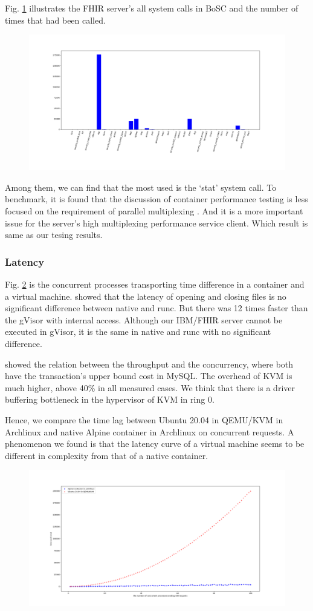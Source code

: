 Fig. \ref{hist} illustrates the FHIR server's all system calls in
BoSC \cite{1495942} and the number of times that had been called.
\begin{figure}
    \centering
    \includegraphics[width=.5\textwidth]{src/hist.png}
    \label{hist}
\end{figure}
Among them, we can find that the most used is the `stat' system call.
To benchmark, it is found that the discussion of container performance testing is less
focused on the requirement of parallel multiplexing
\cite{7371699,KOZHIRBAYEV2017175,7095802,234857}. And it is a more
important issue for the server's high multiplexing performance service client.
Which result is same as our tesing results.

\subsubsection{Latency}
Fig. \ref{conc} is the concurrent processes transporting time
difference in a container and a virtual machine.
\textcite{234857} showed that the latency of opening and closing files
is no significant difference between native and runc. But there was 12 times
faster than the gVisor with internal access. Although our IBM/FHIR server
cannot be executed in gVisor, it is the same in native and runc with no
significant difference.

\textcite{7095802} showed the relation between the throughput and the concurrency,
where both have the transaction's upper bound cost in MySQL. The overhead of KVM is
much higher, above 40\% in all measured cases. We think that there is a driver
buffering bottleneck in the hypervisor of KVM in ring 0.

Hence, we compare the time lag between Ubuntu 20.04 in QEMU/KVM in Archlinux
and native Alpine container in Archlinux on concurrent requests.
A phenomenon we found is that the latency curve of a virtual
machine seems to be different in complexity from that of a native container.

\begin{figure}
    \centering
    \includegraphics[width=.5\textwidth]{src/concurrent.png}
    \label{conc}
\end{figure}
